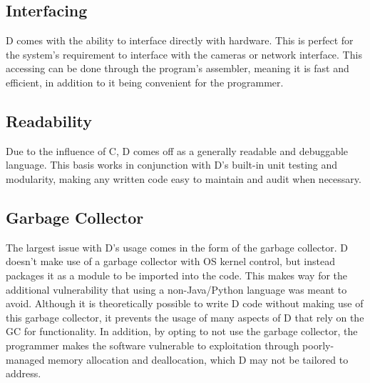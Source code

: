 \subsection{Interfacing}
D comes with the ability to interface directly with hardware. This is perfect
for the system's requirement to interface with the cameras or network interface.
This accessing can be done through the program's assembler, meaning it is fast
and efficient, in addition to it being convenient for the programmer.

\subsection{Readability}
Due to the influence of C, D comes off as a generally readable and debuggable
language. This basis works in conjunction with D's built-in unit testing and 
modularity, making any written code easy to maintain and audit when necessary.

\subsection{Garbage Collector}
The largest issue with D's usage comes in the form of the garbage collector.
D doesn't make use of a garbage collector with OS kernel control, but instead
packages it as a module to be imported into the code. This makes way for the
additional vulnerability that using a non-Java/Python language was meant to
avoid. Although it is theoretically possible to write D code without making use
of this garbage collector, it prevents the usage of many aspects of D that rely
on the GC for functionality. In addition, by opting to not use the garbage
collector, the programmer makes the software vulnerable to exploitation through
poorly-managed memory allocation and deallocation, which D may not be tailored
to address.

